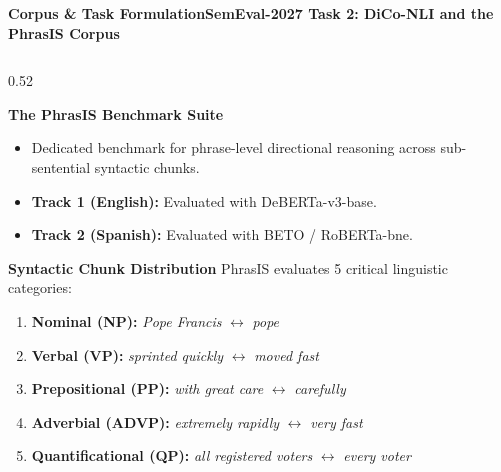 \documentclass[aspectratio=169,10pt]{beamer}
\begin{document}
\begin{frame}{\textbf{Corpus \& Task Formulation}}{\textbf{SemEval-2027 Task 2: DiCo-NLI and the PhrasIS Corpus}}
  \begin{columns}[T]
    \begin{column}{0.52\textwidth}
      \begin{block}{\textbf{The PhrasIS Benchmark Suite}}
        \small
        \begin{itemize}
          \item Dedicated benchmark for phrase-level directional reasoning across sub-sentential syntactic chunks.
          \item \textbf{Track 1 (English):} Evaluated with DeBERTa-v3-base.
          \item \textbf{Track 2 (Spanish):} Evaluated with BETO / RoBERTa-bne.
        \end{itemize}
      \end{block}
      \vspace{0.1cm}
      \begin{block}{\textbf{Syntactic Chunk Distribution}}
        \small
        PhrasIS evaluates 5 critical linguistic categories:
        \begin{enumerate}
          \item \textbf{Nominal (NP):} \textit{Pope Francis} $\leftrightarrow$ \textit{pope}
          \item \textbf{Verbal (VP):} \textit{sprinted quickly} $\leftrightarrow$ \textit{moved fast}
          \item \textbf{Prepositional (PP):} \textit{with great care} $\leftrightarrow$ \textit{carefully}
          \item \textbf{Adverbial (ADVP):} \textit{extremely rapidly} $\leftrightarrow$ \textit{very fast}
          \item \textbf{Quantificational (QP):} \textit{all registered voters} $\leftrightarrow$ \textit{every voter}
        \end{enumerate}
      \end{block}
    \end{column}


\end{columns}
\end{frame}
\end{document}
